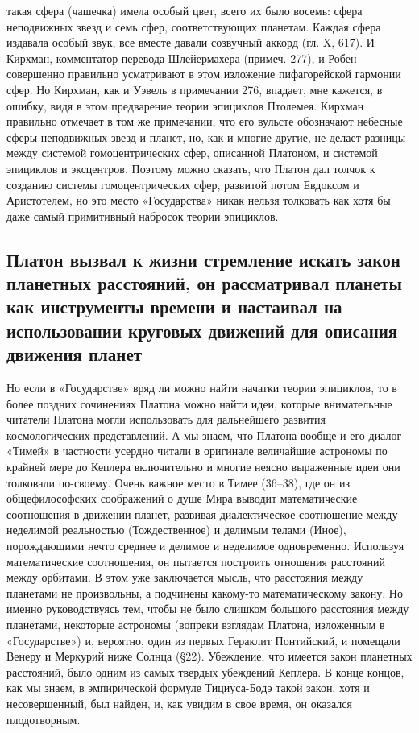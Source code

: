 такая сфера (чашечка)  имела особый цвет, всего их  было восемь: сфера
неподвижных звезд и семь  сфер, соответствующих планетам. Каждая сфера
издавала  особый звук,  все  вместе давали  созвучный  аккорд (гл.  X,
617). И  Кирхман, комментатор  перевода Шлейермахера (примеч.  277), и
Робен совершенно правильно усматривают  в этом изложение пифагорейской
гармонии сфер. Но Кирхман, как и Уэвель в примечании 276, впадает, мне
кажется, в ошибку, видя в  этом предварение теории эпициклов Птолемея.
Кирхман  правильно  отмечает в  том  же  примечании, что  его  вульсте
обозначают  небесные  сферы неподвижных  звезд  и  планет, но,  как  и
многие  другие,  не  делает разницы  между  системой  гомоцентрических
сфер,  описанной   Платоном,  и   системой  эпициклов   и  эксцентров.
Поэтому  можно  сказать, что  Платон  дал  толчок к  созданию  системы
гомоцентрических сфер,  развитой потом Евдоксом и  Аристотелем, но это
место  «Государства» никак  нельзя толковать  как хотя  бы даже  самый
примитивный набросок теории эпициклов.

\subsection{Платон вызвал  к жизни  стремление искать  закон планетных
расстояний,  он   рассматривал  планеты  как  инструменты   времени  и
настаивал  на использовании  круговых движений  для описания  движения
планет}

Но если в «Государстве» вряд  ли можно найти начатки теории эпициклов,
то  в  более поздних  сочинениях  Платона  можно найти  идеи,  которые
внимательные  читатели  Платона  могли  использовать  для  дальнейшего
развития космологических представлений. А мы знаем, что Платона вообще
и его диалог «Тимей» в частности усердно читали в оригинале величайшие
астрономы  по крайней  мере до  Кеплера включительно  и многие  неясно
выраженные идеи  они толковали по-своему.  Очень важное место  в Тимее
(36--38), где  он из общефилософских  соображений о душе  Мира выводит
математические соотношения в  движении планет, развивая диалектическое
соотношение  между  неделимой  реальностью (Тождественное)  и  делимым
телами  (Иное),  порождающими  нечто  среднее и  делимое  и  неделимое
одновременно.  Используя   математические  соотношения,   он  пытается
построить отношения расстояний между  орбитами. В этом уже заключается
мысль,  что расстояния  между  планетами не  произвольны, а  подчинены
какому-то математическому закону. Но  именно руководствуясь тем, чтобы
не  было  слишком  большого   расстояния  между  планетами,  некоторые
астрономы (вопреки  взглядам Платона,  изложенным в  «Государстве») и,
вероятно,  один из  первых Гераклит  Понтийский, и  помещали Венеру  и
Меркурий  ниже Солнца  (§22). Убеждение,  что имеется  закон планетных
расстояний, было  одним из  самых твердых  убеждений Кеплера.  В конце
концов, как мы знаем, в эмпирической формуле Тициуса-Бодэ такой закон,
хотя  и несовершенный,  был найден,  и, как  увидим в  свое время,  он
оказался плодотворным.

